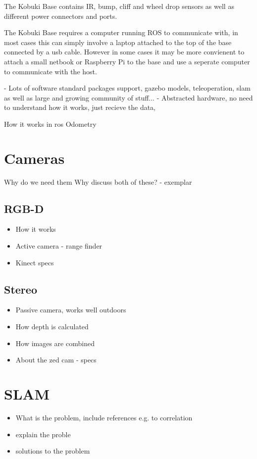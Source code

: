 \documentclass{mproj}
\begin{document}
The Kobuki Base contains IR, bump, cliff and wheel drop sensors as well as different power connectors and ports.

The Kobuki Base requires a computer running ROS to communicate with, in most cases this can simply involve a laptop attached to the top of the base connected by a usb cable. However in some cases it may be more convienent to attach a small netbook or Raspberry Pi to the base and use a seperate computer to communicate with the host.

- Lots of software standard packages support, gazebo models, teleoperation, slam as well as large and growing community of stuff...
- Abstracted hardware, no need to understand how it works, just recieve the data,

How it works in ros
Odometry
\section{Cameras}
Why do we need them
Why discuss both of these? - exemplar
\subsection{RGB-D}
\begin{itemize}
  \item How it works
  \item Active camera - range finder
  \item Kinect specs
\end{itemize}
\subsection{Stereo}

\begin{itemize}
  \item Passive camera, works well outdoors
  \item How depth is calculated
  \item How images are combined 
  \item About the zed cam - specs
\end{itemize}

\section{SLAM}
\begin{itemize}

  \item What is the problem, include references e.g. to correlation
  \item explain the proble
  \item solutions to the problem

 
\end{itemize}
\end{document}
